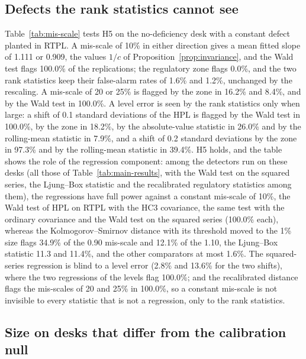 \subsection{Defects the rank statistics cannot see}
\label{sec:results-misscale}

Table~\ref{tab:mis-scale} tests H5 on the no-deficiency desk with a constant defect planted in RTPL.
A mis-scale of 10\% in either direction gives a mean fitted slope of 1.111 or 0.909, the values $1/c$ of Proposition~\ref{prop:invariance}, and the Wald test flags 100.0\% of the replications; the regulatory zone flags 0.0\%, and the two rank statistics keep their false-alarm rates of 1.6\% and 1.2\%, unchanged by the rescaling.
A mis-scale of 20 or 25\% is flagged by the zone in 16.2\% and 8.4\%, and by the Wald test in 100.0\%.
A level error is seen by the rank statistics only when large: a shift of 0.1 standard deviations of the HPL is flagged by the Wald test in 100.0\%, by the zone in 18.2\%, by the absolute-value statistic in 26.0\% and by the rolling-mean statistic in 7.9\%, and a shift of 0.2 standard deviations by the zone in 97.3\% and by the rolling-mean statistic in 39.4\%.
H5 holds, and the table shows the role of the regression component: among the detectors run on these desks (all those of Table~\ref{tab:main-results}, with the Wald test on the squared series, the Ljung--Box statistic and the recalibrated regulatory statistics among them), the regressions have full power against a constant mis-scale of 10\%, the Wald test of HPL on RTPL with the HC3 covariance, the same test with the ordinary covariance and the Wald test on the squared series (100.0\% each), whereas the Kolmogorov--Smirnov distance with its threshold moved to the 1\% size flags 34.9\% of the 0.90 mis-scale and 12.1\% of the 1.10, the Ljung--Box statistic 11.3 and 11.4\%, and the other comparators at most 1.6\%.
The squared-series regression is blind to a level error (2.8\% and 13.6\% for the two shifts), where the two regressions of the levels flag 100.0\%; and the recalibrated distance flags the mis-scales of 20 and 25\% in 100.0\%, so a constant mis-scale is not invisible to every statistic that is not a regression, only to the rank statistics.



\subsection{Size on desks that differ from the calibration null}
\label{sec:results-altnull}

